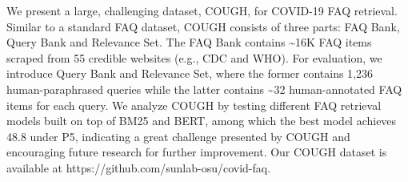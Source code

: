 We present a large, challenging dataset, COUGH,  for COVID-19 FAQ retrieval. Similar to a standard FAQ dataset, COUGH consists of three parts: FAQ Bank, Query Bank and  Relevance Set. The FAQ Bank contains {\textasciitilde}16K FAQ items scraped from 55 credible websites (e.g., CDC and WHO). For evaluation, we introduce Query Bank and  Relevance Set, where the former contains 1,236 human-paraphrased queries while the latter contains {\textasciitilde}32 human-annotated FAQ items for each query. We analyze COUGH by testing different FAQ retrieval models built on top of BM25 and BERT, among which the best model achieves 48.8 under P\@5, indicating a great challenge presented by COUGH and encouraging future research for further improvement.  Our COUGH dataset is available at https://github.com/sunlab-osu/covid-faq.
